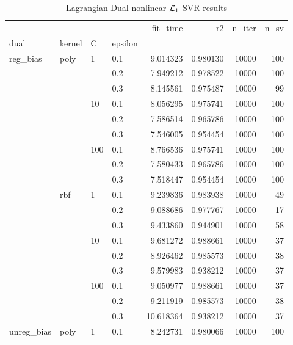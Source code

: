 \begin{table}[H]
\centering
\caption{Lagrangian Dual nonlinear $\protect \mathcal{L}_1$-SVR results}
\label{nonlinear_lagrangian_dual_l1_svr_cv_results}
\begin{tabular}{llllrrrr}
\toprule
           &     &     &     &   fit\_time &        r2 &  n\_iter &  n\_sv \\
dual & kernel & C & epsilon &            &           &         &       \\
\midrule
reg\_bias & poly & 1   & 0.1 &   9.014323 &  0.980130 &   10000 &   100 \\
           &     &     & 0.2 &   7.949212 &  0.978522 &   10000 &   100 \\
           &     &     & 0.3 &   8.145561 &  0.975487 &   10000 &    99 \\
           &     & 10  & 0.1 &   8.056295 &  0.975741 &   10000 &   100 \\
           &     &     & 0.2 &   7.586514 &  0.965786 &   10000 &   100 \\
           &     &     & 0.3 &   7.546005 &  0.954454 &   10000 &   100 \\
           &     & 100 & 0.1 &   8.766536 &  0.975741 &   10000 &   100 \\
           &     &     & 0.2 &   7.580433 &  0.965786 &   10000 &   100 \\
           &     &     & 0.3 &   7.518447 &  0.954454 &   10000 &   100 \\
           & rbf & 1   & 0.1 &   9.239836 &  0.983938 &   10000 &    49 \\
           &     &     & 0.2 &   9.088686 &  0.977767 &   10000 &    17 \\
           &     &     & 0.3 &   9.433860 &  0.944901 &   10000 &    58 \\
           &     & 10  & 0.1 &   9.681272 &  0.988661 &   10000 &    37 \\
           &     &     & 0.2 &   8.926462 &  0.985573 &   10000 &    38 \\
           &     &     & 0.3 &   9.579983 &  0.938212 &   10000 &    37 \\
           &     & 100 & 0.1 &   9.050977 &  0.988661 &   10000 &    37 \\
           &     &     & 0.2 &   9.211919 &  0.985573 &   10000 &    38 \\
           &     &     & 0.3 &  10.618364 &  0.938212 &   10000 &    37 \\
unreg\_bias & poly & 1   & 0.1 &   8.242731 &  0.980066 &   10000 &   100 \\

\end{tabular}
\end{table}
